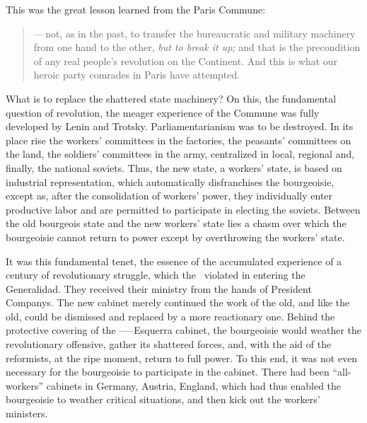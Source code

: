 \medskip

This was the great lesson learned from the Paris Commune:

\begin{quotation}
  \noindent
  —\,not, as in the past, to transfer the bureaucratic and military machinery from one hand to the other, \emph{but to break it up;} and that is the precondition of any real people’s revolution on the Continent. And this is what our heroic party comrades in Paris have attempted.
\end{quotation}

What is to replace the shattered state machinery? On this, the fundamental question of revolution, the meager experience of the Commune was fully developed by Lenin and Trotsky. Parliamentarianism was to be destroyed. In its place rise the workers’ committees in the factories, the peasants’ committees on the land, the soldiers’ committees in the army, centralized in local, regional and, finally, the national soviets. Thus, the new state, a workers’ state, is based on industrial representation, which automatically disfranchises the bourgeoisie, except as, after the consolidation of workers’ power, they individually enter productive labor and are permitted to participate in electing the soviets. Between the old bourgeois state and the new workers’ state lies a chasm over which the bourgeoisie cannot return to power except by overthrowing the workers’ state.

It was this fundamental tenet, the essence of the accumulated experience of a century of revolutionary struggle, which the \POUM\ violated in entering the Generalidad. They received their ministry from the hands of President Companys. The new cabinet merely continued the work of the old, and like the old, could be dismissed and replaced by a more reactionary one. Behind the protective covering of the \POUM--\CNT--\PSUC--Esquerra cabinet, the bourgeoisie would weather the revolutionary offensive, gather its shattered forces, and, with the aid of the reformists, at the ripe moment, return to full power. To this end, it was not even necessary for the bourgeoisie to participate in the cabinet. There had been ``all-workers'' cabinets in Germany, Austria, England, which had thus enabled the bourgeoisie to weather critical situations, and then kick out the workers’ ministers.

